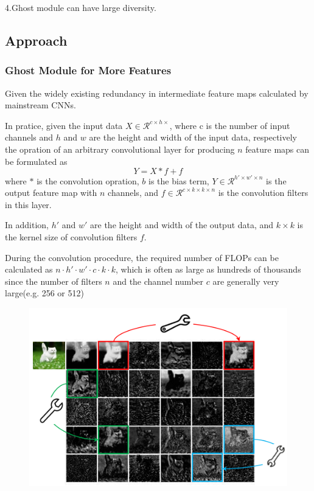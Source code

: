 \documentclass[11pt]{article}
\begin{document}
\noindent4.Ghost module can have large diversity.
\subsection{Approach}
\subsubsection{Ghost Module for More Features}
Given the widely existing redundancy in intermediate feature maps calculated by mainstream CNNs.

In pratice, given the input data $X\in \mathcal{R}^{c\times h\times}$, where c is the number of input channels and $h$ and $w$ are the height and width of the input data, respectively the opration of an arbitrary convolutional layer for producing $n$ feature maps can be formulated as 
$$Y = X*f +f$$
where $*$ is the convolution opration, $b$ is the bias term, $Y\in \mathcal{R}^{h'\times w'\times n}$ is the output feature map with $n$ channels, and $f\in \mathcal{R}^{c\times k\times k\times n}$ is the convolution filters in this layer.

In addition, $h'$ and $w'$ are the height and width of the output data, and $k\times k$ is the kernel size of convolution filters $f$.

During the convolution procedure, the required number of FLOPs can be calculated as $n\cdot h'\cdot w'\cdot c\cdot k\cdot k$, which is often as large as hundreds  of thousands since the number of filters $n$ and the channel number $c$ are generally very large(e.g. 256 or 512)

\begin{figure}[H]
	\centering
	\includegraphics[scale = 0.5]{66}
\end{figure}
\end{document}
